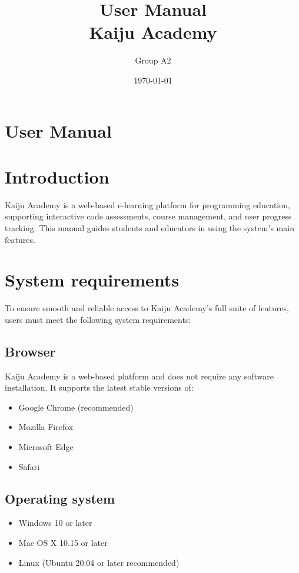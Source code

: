 \documentclass[a4paper,11pt]{scrartcl}
\title{User Manual\\Kaiju Academy}
\author{Group A2}
\date{\today}
\begin{document}
\maketitle

\section*{User Manual}

\tableofcontents
\newpage

\section{Introduction}

Kaiju Academy is a web-based e-learning platform for programming education, supporting interactive code assessments, course management, and user progress tracking. This manual guides students and educators in using the system’s main features.



\section{System requirements}
To ensure smooth and reliable access to Kaiju Academy’s full suite of features, users must meet the following system requirements:
\subsection{Browser}
Kaiju Academy is a web-based platform and does not require any software installation. It supports the latest stable versions of:
\begin{itemize}[leftmargin=*]
    \item Google Chrome (recommended)
    \item Mozilla Firefox
    \item Microsoft Edge
    \item Safari
\end{itemize}

\subsection{Operating system}
\begin{itemize}[leftmargin=*]
    \item Windows 10 or later
    \item Mac OS X 10.15 or later
    \item Linux (Ubuntu 20.04 or later recommended)
\end{itemize}
\end{document}

